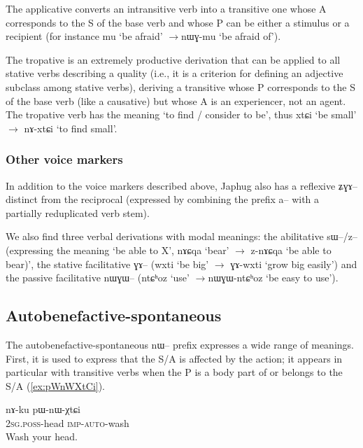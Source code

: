 \documentclass[oldfontcommands,oneside,a4paper,11pt]{article}
\newcommand{\ipa}[1]{{\phon#1}} %
\begin{document}
The applicative converts an intransitive verb into a transitive one whose A corresponds to the S of the base verb and whose P can be either a stimulus or a recipient (for instance \ipa{mu} `be afraid' $\rightarrow$\ipa{nɯɣ-mu} `be afraid of'). 

The tropative is an extremely productive derivation that can be applied to all stative verbs describing a quality (i.e., it is a criterion for defining an adjective subclass among stative verbs), deriving a transitive whose P corresponds to the S of the base verb (like a causative) but whose A is an experiencer, not an agent. The tropative verb has the meaning `to find / consider to be', thus \ipa{xtɕi} `be small' $\rightarrow$ \ipa{nɤ-xtɕi} `to find small'.

\subsubsection{Other voice markers}
In addition to the voice markers described above, Japhug also has a reflexive \ipa{ʑɣɤ--} distinct from the reciprocal (expressed by combining the prefix \ipa{a--} with a partially reduplicated verb stem).

We also find three verbal derivations with modal meanings: the abilitative \ipa{sɯ--/z--} (expressing the meaning `be able to X', \ipa{nɤɕqa} `bear' $\rightarrow$ \ipa{z-nɤɕqa} `be able to bear)', the stative facilitative \ipa{ɣɤ--} (\ipa{wxti} `be big' $\rightarrow$ \ipa{ɣɤ-wxti} `grow big easily') and the passive facilitative \ipa{nɯɣɯ--} (\ipa{ntɕʰoz} `use' $\rightarrow$\ipa{nɯɣɯ-ntɕʰoz} `be easy to use').
   
\subsection{Autobenefactive-spontaneous}

The autobenefactive-spontaneous \ipa{nɯ--} prefix expresses a wide range of meanings. First, it is used to express that the S/A is affected by the action; it appears in particular with transitive verbs when the P is a body part of or belongs to the S/A (\ref{ex:pWnWXtCi}).

\begin{exe}
\ex \label{ex:pWnWXtCi}
\gll 
\ipa{nɤ-ku} 	\ipa{pɯ-nɯ-χtɕi} \\
\textsc{2sg.poss}-head \textsc{imp-auto}-wash \\
\glt Wash your head.
\end{exe}
\end{document}
